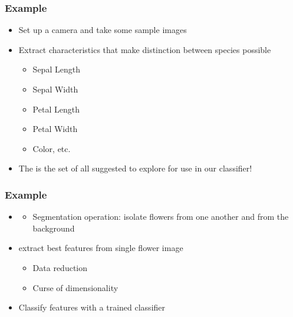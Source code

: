 \begin{frame}
   \frametitle{Example \cont}


   \begin{itemize}
      \item Set up a camera and take some sample images
      \item Extract characteristics that make distinction between species possible
        \begin{itemize}
           \item Sepal Length
           \item Sepal Width
           \item Petal Length
           \item Petal Width
           \item Color, etc.
        \end{itemize}
      \item The is the set of all suggested  to explore for use in our classifier!
   \end{itemize}
\end{frame}


\begin{frame}
   \frametitle{Example \cont}

   \begin{itemize}
      \item {}
        \begin{itemize}
           \item Segmentation operation: isolate flowers from one another and from the background\\[.5cm]
        \end{itemize}
      \item {} extract best features from single flower image
        \begin{itemize}
           \item Data reduction
           \item Curse of dimensionality\\[.5cm]
        \end{itemize}
      \item {} Classify features with a trained classifier
   \end{itemize}
\end{frame}


